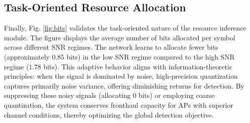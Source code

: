 \subsection{Task-Oriented Resource Allocation}
Finally, Fig. \ref{fig:bits} validates the task-oriented nature of the resource inference module. The figure displays the average number of bits allocated per symbol across different SNR regimes. The network learns to allocate fewer bits (approximately $0.85$ bits) in the low SNR regime compared to the high SNR regime ($1.78$ bits). This adaptive behavior aligns with information-theoretic principles: when the signal is dominated by noise, high-precision quantization captures primarily noise variance, offering diminishing returns for detection. By suppressing these noisy signals (allocating $0$ bits) or employing coarse quantization, the system conserves fronthaul capacity for APs with superior channel conditions, thereby optimizing the global detection objective.